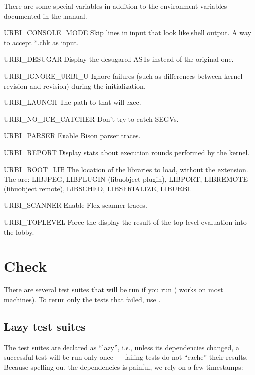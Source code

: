 There are some special variables in addition to the environment
variables documented in the manual.

\begin{envs}
\item[URBI\_CONSOLE\_MODE] Skip lines in input that look like shell
  output.  A way to accept *.chk as input.

\item[URBI\_DESUGAR] Display the desugared ASTs instead of the
  original one.

\item[URBI\_IGNORE\_URBI\_U] Ignore failures (such as differences between
  kernel revision and  revision) during the initialization.

\item[URBI\_LAUNCH] The path to  that
   will exec.

\item[URBI\_NO\_ICE\_CATCHER] Don't try to catch SEGVs.

\item[URBI\_PARSER] Enable Bison parser traces.

\item[URBI\_REPORT] Display stats about execution rounds performed by
  the kernel.

\item[URBI\_ROOT\_LIB\var{name}] The location of the libraries to
  load, without the extension.  The  are: LIBJPEG,
  LIBPLUGIN (libuobject plugin), LIBPORT, LIBREMOTE (libuobject
  remote), LIBSCHED, LIBSERIALIZE, LIBURBI.

\item[URBI\_SCANNER] Enable Flex scanner traces.

\item[URBI\_TOPLEVEL] Force the display the result of the top-level
  evaluation into the lobby.
\end{envs}

\section{Check}
There are several test suites that will be run if you run  ( works on most machines).  To rerun only the tests
that failed, use .

\subsection{Lazy test suites}
The test suites are declared as ``lazy'', i.e., unless its
dependencies changed, a successful test will be run only once ---
failing tests do not ``cache'' their results.  Because spelling out
the dependencies is painful, we rely on a few timestamps:

